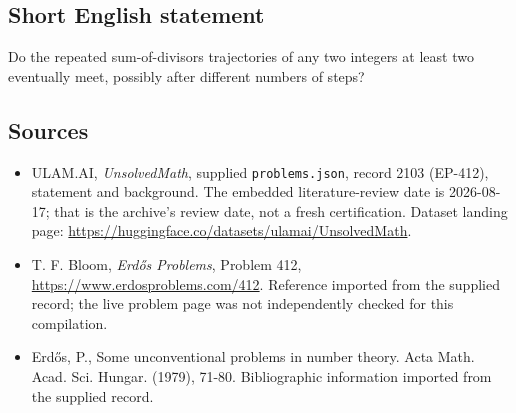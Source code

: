 \documentclass[11pt,a4paper]{article}
\begin{document}
\subsection{Short English statement}

Do the repeated sum-of-divisors trajectories of any two integers at least two eventually meet, possibly after different numbers of steps?

\subsection{Sources}

{\small

\begin{itemize}

\item[\hypertarget{source:2103:1}{S1}] ULAM.AI, \emph{UnsolvedMath}, supplied \texttt{problems.json}, record 2103 (EP-412), statement and background. The embedded literature-review date is 2026-08-17; that is the archive’s review date, not a fresh certification. Dataset landing page: \url{https://huggingface.co/datasets/ulamai/UnsolvedMath}.

\item[\hypertarget{source:2103:2}{S2}] T. F. Bloom, \emph{Erdős Problems}, Problem 412, \url{https://www.erdosproblems.com/412}. Reference imported from the supplied record; the live problem page was not independently checked for this compilation.

\item[\hypertarget{source:2103:3}{S3}] Erd\H{o}s, P., Some unconventional problems in number theory. Acta Math. Acad. Sci. Hungar. (1979), 71-80. Bibliographic information imported from the supplied record.

\end{itemize}

}

\label{end:2103}
\end{document}
